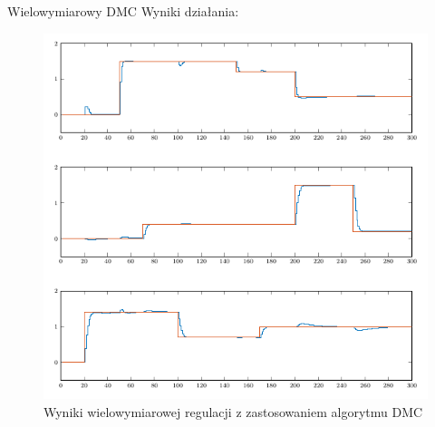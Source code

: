 \begin{frame}{Wielowymiarowy DMC}
Wyniki działania:
	\begin{center}
		\begin{figure}[H]
            		\includegraphics[scale=0.4]{images/innydmc.png} %
          			 \caption{Wyniki wielowymiarowej regulacji z zastosowaniem algorytmu DMC}
		\end{figure}
	\end{center}
\end{frame}
